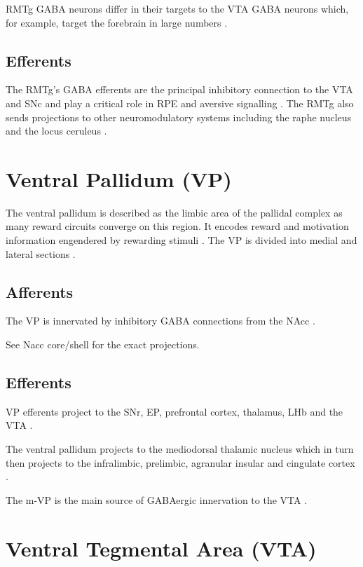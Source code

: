 \documentclass[12pt,a4paper]{article}
\let\oldsection\section
\renewcommand\section{\clearpage\oldsection}
\begin{document}
RMTg GABA neurons differ in their targets to the VTA GABA neurons which, for example, target the forebrain in large numbers \citep{Barrot2012}. 

\subsection{Efferents}

The RMTg’s GABA efferents are the principal inhibitory connection to the VTA and SNc and play a critical role in RPE and aversive signalling \citep{Bourdy2012}. The RMTg also sends projections to other neuromodulatory systems including the raphe nucleus and the locus ceruleus \citep{Barrot2012} \citep{Hong2011}.



\section{Ventral Pallidum (VP)}

The ventral pallidum is described as the limbic area of the pallidal complex as
many reward circuits converge on this region. It encodes reward and motivation
information engendered by rewarding stimuli \citep{Smith2009}. The VP is divided into medial
and lateral sections \citep{Sesack2010}.

\subsection{Afferents}

The VP is innervated by inhibitory GABA connections from the
NAcc \citep{Basar2010}. 

See Nacc core/shell for the exact projections.

\subsection{Efferents}

VP efferents project to the SNr, EP, prefrontal cortex, thalamus, LHb and the VTA \citep{Groenewegen1993} \citep{Ikemoto2007}.

The ventral pallidum projects to the mediodorsal thalamic nucleus which in turn then 
projects to the infralimbic, prelimbic, agranular insular and cingulate cortex \citep{Ikemoto2007}.

The m-VP is the main source of GABAergic innervation to the VTA \citep{Sesack2010}.


\section{Ventral Tegmental Area (VTA)}
\end{document}
